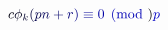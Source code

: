 \documentclass[12pt]{article}
\begin{document}
\makeatletter
\renewcommand*{\@textcolor}[3]{%
  \protect\leavevmode
  \begingroup
    \color#1{#2}#3%
  \endgroup
}
\makeatother
\begin{displaymath}
\mathcolor[RGB]{0,0,15}{c} \mathcolor[RGB]{0,0,30}{\phi} _ { \mathcolor[RGB]{0,0,45}{k} } \mathcolor[RGB]{0,0,60}{(} \mathcolor[RGB]{0,0,75}{p} \mathcolor[RGB]{0,0,90}{n} \mathcolor[RGB]{0,0,105}{+} \mathcolor[RGB]{0,0,120}{r} \mathcolor[RGB]{0,0,135}{)} \mathcolor[RGB]{0,0,150}{\equiv} \mathcolor[RGB]{0,0,165}{0} \mathcolor[RGB]{0,0,180}{\pmod} { \mathcolor[RGB]{0,0,195}{p} }
\end{displaymath}
\end{document}
